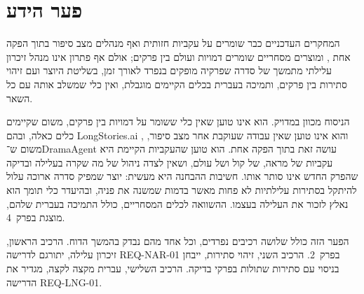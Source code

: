 \section{פער הידע}
\label{sec:ch3-gap}
המחקרים העדכניים כבר שומרים על עקביות חזותית ואף מנהלים מצב סיפור בתוך הפקה אחת \cite{huang2026dramaagent}, ומוצרים מסחריים שומרים דמויות ועולם בין פרקים; אולם אף פתרון אינו מנהל זיכרון עלילתי מתמשך של סדרה שפרקיה מופקים בנפרד לאורך זמן, בשליטת היוצר ועם זיהוי סתירות בין פרקים, ותמיכה בעברית בכלים הקיימים מוגבלת, ואין כלי שמשלב אותה עם כל השאר.

הניסוח מכוון במדויק. הוא אינו טוען שאין כלי ששומר על דמויות בין פרקים, משום שקיימים כלים כאלה, ובהם \textenglish{LongStories.ai} \cite{longstories}, והוא אינו טוען שאין עבודה שעוקבת אחר מצב סיפור, משום ש־\textenglish{DramaAgent} עושה זאת בתוך הפקה אחת. הוא טוען שהעקביות הקיימת היא עקביות של מראה, של קול ושל עולם, ושאין לצדה ניהול של מה שקרה בעלילה ובדיקה שהפרק החדש אינו סותר אותו. חשיבות ההבחנה היא מעשית: יוצר שמפיק סדרה ארוכה עלול להיתקל בסתירות עלילתיות לא פחות מאשר בדמות שמשנה את פניה, ובהיעדר כלי תומך הוא נאלץ לזכור את העלילה בעצמו. ההשוואה לכלים המסחריים, כולל התמיכה בעברית שלהם, מוצגת בפרק~4.

הפער הזה כולל שלושה רכיבים נפרדים, וכל אחד מהם נבדק בהמשך הדוח. הרכיב הראשון, זיכרון עלילה, יתורגם לדרישה \textenglish{REQ-NAR-01} בפרק~2. הרכיב השני, זיהוי סתירות, ייבחן בניסוי עם סתירות שתולות בפרקי בדיקה. הרכיב השלישי, עברית מקצה לקצה, מגדיר את הדרישה \textenglish{REQ-LNG-01}.
